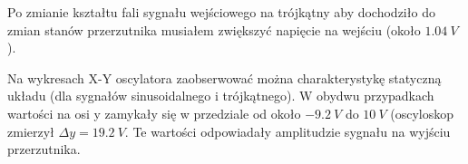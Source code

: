 \documentclass[14pt, table]{extarticle}
\begin{document}
Po zmianie kształtu fali sygnału wejściowego na trójkątny aby dochodziło do zmian stanów przerzutnika musiałem zwiększyć napięcie na wejściu (około $1.04 \ V$).
\begin{figure}[H]
    \centering
    \qquad
\end{figure}

\newpage
Na wykresach X-Y oscylatora zaobserwować można charakterystykę statyczną układu (dla sygnałów sinusoidalnego i trójkątnego). W obydwu przypadkach wartości na osi y zamykały się w przedziale od około $-9.2 \ V$ do $10 \ V$ (oscyloskop zmierzył $\Delta y = 19.2 \ V$. Te wartości odpowiadały amplitudzie sygnału na wyjściu przerzutnika. \\
\end{document}
